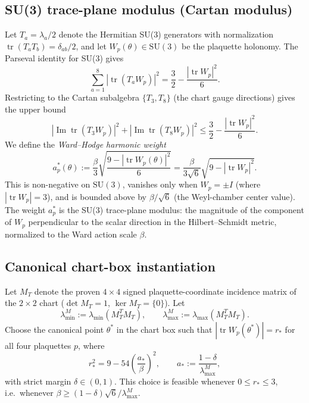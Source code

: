 \subsection{SU(3) trace-plane modulus (Cartan modulus)}
\label{ssec:cartan_modulus}

Let \(T_{a}=\lambda_{a}/2\) denote the Hermitian SU(3) generators with
normalization \(\operatorname{tr}(T_{a}T_{b})=\delta_{ab}/2\), and let
\(W_{p}(\theta)\in\mathrm{SU}(3)\) be the plaquette holonomy.  The
Parseval identity for SU(3) gives
\begin{equation}
  \label{eq:su3_parseval}
  \sum_{a=1}^{8}|\operatorname{tr}(T_{a}W_{p})|^{2}
  =\frac{3}{2}-\frac{|\operatorname{tr}W_{p}|^{2}}{6}.
\end{equation}
Restricting to the Cartan subalgebra \(\{T_{3},T_{8}\}\) (the chart gauge
directions) gives the upper bound
\[
  |\operatorname{Im}\operatorname{tr}(T_{3}W_{p})|^{2}
  +|\operatorname{Im}\operatorname{tr}(T_{8}W_{p})|^{2}
  \le \frac{3}{2}-\frac{|\operatorname{tr}W_{p}|^{2}}{6}.
\]
We define the \emph{Ward--Hodge harmonic weight}
\begin{equation}
  \label{eq:ward_hodge_weight}
  a_{p}^{*}(\theta)
  :=\frac{\beta}{3}\sqrt{\frac{9-|\operatorname{tr}W_{p}(\theta)|^{2}}{6}}
  =\frac{\beta}{3\sqrt{6}}\sqrt{9-|\operatorname{tr}W_{p}|^{2}}.
\end{equation}
This is non-negative on \(\mathrm{SU}(3)\), vanishes only when
\(W_{p}=\pm I\) (where \(|\operatorname{tr}W_{p}|=3\)), and is bounded
above by \(\beta/\sqrt{6}\) (the Weyl-chamber center value).  The weight
\(a_{p}^{*}\) is the SU(3) trace-plane modulus: the magnitude of the
component of \(W_{p}\) perpendicular to the scalar direction in the
Hilbert--Schmidt metric, normalized to the Ward action scale \(\beta\).

\subsection{Canonical chart-box instantiation}
\label{ssec:canonical_inst}

Let \(M_{T}\) denote the proven \(4\times 4\) signed plaquette-coordinate
incidence matrix of the \(2\times 2\) chart
(\(\det M_{T}=1\), \(\ker M_{T}=\{0\}\)).  Let
\[
  \lambda_{\min}^{M}:=\lambda_{\min}(M_{T}^{T}M_{T}),\qquad
  \lambda_{\max}^{M}:=\lambda_{\max}(M_{T}^{T}M_{T}).
\]
Choose the canonical point \(\theta^{*}\) in the chart box such that
\(|\operatorname{tr}W_{p}(\theta^{*})|=r_{*}\) for all four plaquettes
\(p\), where
\[
  r_{*}^{2}=9-54\left(\frac{a_{*}}{\beta}\right)^{2},\qquad
  a_{*}:=\frac{1-\delta}{\lambda_{\max}^{M}},
\]
with strict margin \(\delta\in(0,1)\).  This choice is feasible whenever
\(0\le r_{*}\le 3\), i.e.\ whenever
\(\beta\ge(1-\delta)\sqrt{6}/\lambda_{\max}^{M}\).

